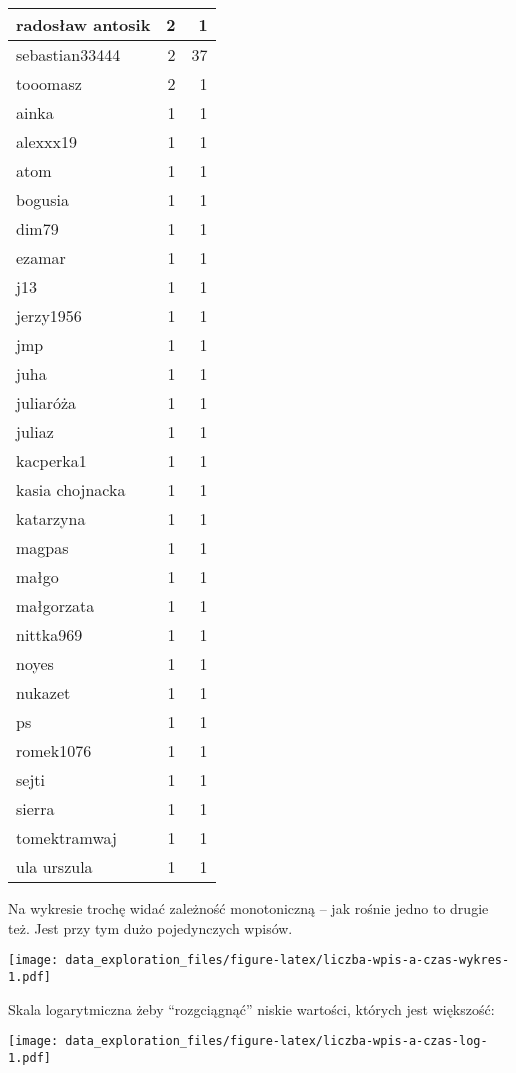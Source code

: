 \documentclass[
]{article}
\begin{document}
\begin{table}
\begin{tabular}[t]{l|r|r}
\hline
radosław antosik & 2 & 1\\
\hline
sebastian33444 & 2 & 37\\
\hline
tooomasz & 2 & 1\\
\hline
ainka & 1 & 1\\
\hline
alexxx19 & 1 & 1\\
\hline
atom & 1 & 1\\
\hline
bogusia & 1 & 1\\
\hline
dim79 & 1 & 1\\
\hline
ezamar & 1 & 1\\
\hline
j13 & 1 & 1\\
\hline
jerzy1956 & 1 & 1\\
\hline
jmp & 1 & 1\\
\hline
juha & 1 & 1\\
\hline
juliaróża & 1 & 1\\
\hline
juliaz & 1 & 1\\
\hline
kacperka1 & 1 & 1\\
\hline
kasia chojnacka & 1 & 1\\
\hline
katarzyna & 1 & 1\\
\hline
magpas & 1 & 1\\
\hline
małgo & 1 & 1\\
\hline
małgorzata & 1 & 1\\
\hline
nittka969 & 1 & 1\\
\hline
noyes & 1 & 1\\
\hline
nukazet & 1 & 1\\
\hline
ps & 1 & 1\\
\hline
romek1076 & 1 & 1\\
\hline
sejti & 1 & 1\\
\hline
sierra & 1 & 1\\
\hline
tomektramwaj & 1 & 1\\
\hline
ula urszula & 1 & 1\\
\hline
\end{tabular}
\end{table}

Na wykresie trochę widać zależność monotoniczną -- jak rośnie jedno to
drugie też. Jest przy tym dużo pojedynczych wpisów.

\texttt{[image: data\_exploration\_files/figure-latex/liczba-wpis-a-czas-wykres-1.pdf]}

Skala logarytmiczna żeby ``rozgciągnąć'' niskie wartości, których jest
większość:

\texttt{[image: data\_exploration\_files/figure-latex/liczba-wpis-a-czas-log-1.pdf]}
\end{document}
